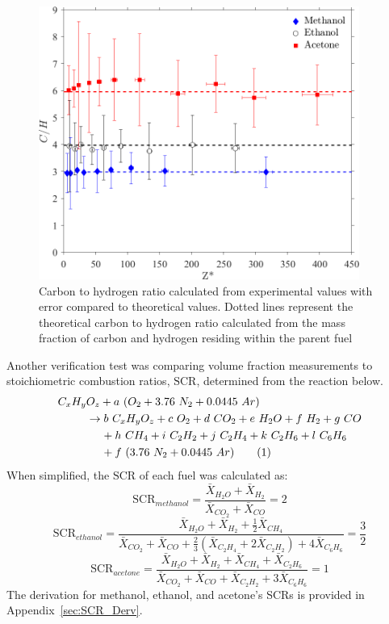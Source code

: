 \documentclass[12pt]{article}
\newcommand\numberthis{\addtocounter{equation}{1}\tag{\theequation}}
\begin{document}
\begin{figure}[h!]
	\centering
\includegraphics[width=10.5cm, keepaspectratio]{C2H_ratio_Comparison.png}
	\caption[Carbon to hydrogen ratio calculated from experimental values compared to theoretical values]{Carbon to hydrogen ratio calculated from experimental values with error compared to theoretical values. Dotted lines represent the theoretical carbon to hydrogen ratio calculated from the mass fraction of carbon and hydrogen residing within the parent fuel}
	\label{fig:C2H}
\end{figure}

Another verification test was comparing volume fraction measurements to stoichiometric combustion ratios, $\text{SCR}$, determined from the reaction below.
\begin{align*}
C_{x}H_{y}&O_{z}+a~(O_{2}+3.76~N_{2}+0.0445~Ar)\\
&\rightarrow b~C_{x}H_{y}O_{z}+c~O_{2}+ d~CO_{2}+e~H_{2}O+f~H_{2}+ g~CO\\
&~~~~+h~CH_{4}+ i~C_{2}H_{2}+j~C_{2}H_{4}+k~C_{2}H_{6}+l~C_{6}H_{6}\\
&~~~~+f~(3.76~N_{2}+0.0445~Ar) \numberthis \label{eq:Ideal_rxn}
\end{align*}
When simplified, the $\text{SCR}$ of each fuel was calculated as:
\begin{equation}\label{eq:prod_ratio_methanol}
 \text{SCR}_{methanol}=\frac{\bar{X}_{H_2O}+\bar{X}_{H_2}}{\bar{X}_{CO_2}+\bar{X}_{CO}}=2
\end{equation}
\begin{equation}\label{eq:prod_ratio_ethanol}
\text{SCR}_{ethanol}=\frac{\bar{X}_{H_2O}+\bar{X}_{H_2}+\frac{1}{2}\bar{X}_{CH_4}}{\bar{X}_{CO_2}+\bar{X}_{CO}+\frac{2}{3}(\bar{X}_{C_2H_4}+2\bar{X}_{C_2H_2})+4\bar{X}_{C_6H_6}}=\frac{3}{2}
\end{equation}
\begin{equation}\label{eq:prod_ratio_acetone}
\text{SCR}_{acetone}=\frac{\bar{X}_{H_2O}+\bar{X}_{H_2}+\bar{X}_{CH_4}+\bar{X}_{C_2H_6}}{\bar{X}_{CO_2}+\bar{X}_{CO}+\bar{X}_{C_2H_2}+3\bar{X}_{C_6H_6}}=1
\end{equation}
The derivation for methanol, ethanol, and acetone's SCRs is provided in Appendix~\ref{sec:SCR_Derv}.
\end{document}
